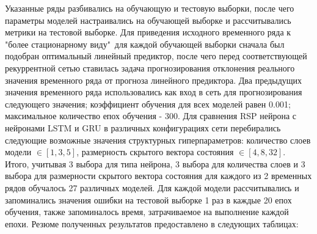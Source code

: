 \documentclass[11pt]{article}
\begin{document}
Указанные ряды разбивались на обучающую и тестовую выборки, после чего параметры моделей настраивались на обучающей выборке и рассчитывались метрики на тестовой выборке.
Для приведения исходного временного ряда к "более стационарному виду"\ для каждой обучающей выборки сначала был подобран оптимальный линейный предиктор, после чего перед соответствующей рекуррентной сетью ставилась задача прогнозирования отклонения реального значения временного ряда от прогноза линейного предиктора.
Два предыдущих значения временного ряда использовались как вход в сеть для прогнозирования следующего значения; коэффициент обучения для всех моделей равен 0.001; максимальное количество епох обучения - 300. 
Для сравнения RSP нейрона с нейронами LSTM и GRU в различных конфигурациях сети перебирались следующие возможные значения структурных гиперпараметров: количество слоев модели $\in [1, 3, 5]$, размерность скрытого вектора состояния $\in [4, 8, 32]$.
\\
Итого, учитывая 3 выбора для типа нейрона, 3 выбора для количества слоев и 3 выбора для размерности скрытого вектора состояния для каждого из 2 временных рядов обучалось 27 различных моделей. Для каждой модели рассчитывались и запоминались значения ошибки на тестовой выборке 1 раз в каждые 20 епох обучения, также запоминалось время, затрачиваемое на выполнение каждой епохи. Резюме полученных результатов предоставлено в следующих таблицах:
\\
\end{document}
